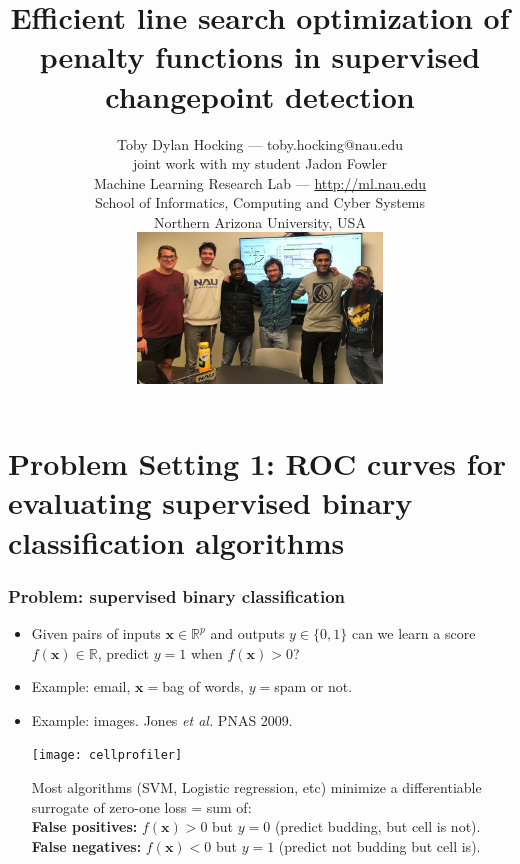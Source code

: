 \documentclass[t]{beamer}
\begin{document}
\title{Efficient line search optimization of penalty functions in
  supervised changepoint detection}

\author{
  Toby Dylan Hocking --- toby.hocking@nau.edu\\ 
  joint work with my student Jadon Fowler\\
  Machine Learning Research Lab --- \url{http://ml.nau.edu}\\
  School of Informatics, Computing and Cyber Systems\\
  Northern Arizona University, USA\\
  \includegraphics[height=4cm]{2023-02-02-group-meeting} \\
}

\date{}

\maketitle

\section{Problem Setting 1: ROC curves for evaluating supervised  binary classification algorithms}

\begin{frame}
  \frametitle{Problem: supervised binary classification}
  
  \begin{itemize}
  \item Given pairs of inputs $\mathbf x\in\mathbb R^p$ and outputs
    $y\in\{0,1\}$ can we learn a score 
    $f(\mathbf x)\in\mathbb R$, predict $y=1$ when $f(\mathbf x)>0$?
  \item Example: email, $\mathbf x =$bag of words, $y=$spam or not.
  \item Example: images. Jones {\it et al.} PNAS 2009.
    \parbox{2in}{\texttt{[image: cellprofiler]}}
    \parbox{1.9in}{Most algorithms (SVM, Logistic regression, etc) minimize a differentiable surrogate of zero-one loss = sum of:\\
      \textbf{False positives:} $f(\mathbf x)>0$ but $y=0$ (predict
      budding, but cell is not).\\
      \textbf{False negatives:} $f(\mathbf x)<0$ but $y=1$ (predict
      not budding but cell is).  }
  \end{itemize} 
\end{frame}
\end{document}
